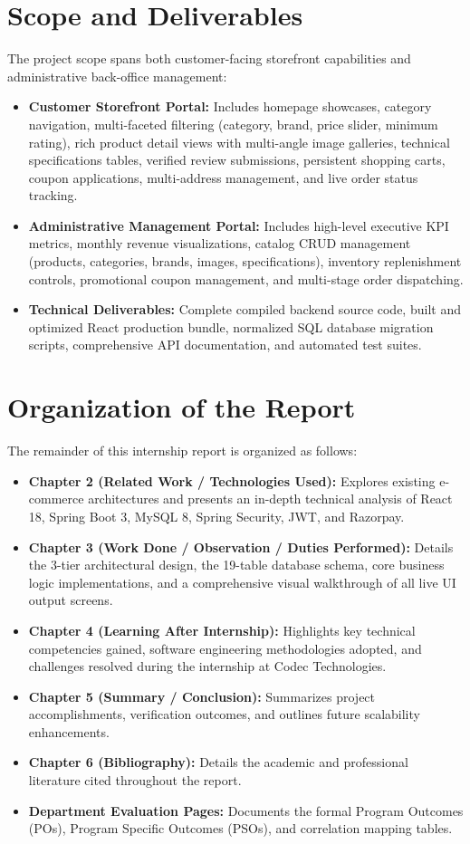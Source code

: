 \section{Scope and Deliverables}
The project scope spans both customer-facing storefront capabilities and administrative back-office management:
\begin{itemize}[leftmargin=2.0em]
    \item \textbf{Customer Storefront Portal:} Includes homepage showcases, category navigation, multi-faceted filtering (category, brand, price slider, minimum rating), rich product detail views with multi-angle image galleries, technical specifications tables, verified review submissions, persistent shopping carts, coupon applications, multi-address management, and live order status tracking.
    \item \textbf{Administrative Management Portal:} Includes high-level executive KPI metrics, monthly revenue visualizations, catalog CRUD management (products, categories, brands, images, specifications), inventory replenishment controls, promotional coupon management, and multi-stage order dispatching.
    \item \textbf{Technical Deliverables:} Complete compiled backend source code, built and optimized React production bundle, normalized SQL database migration scripts, comprehensive API documentation, and automated test suites.
\end{itemize}

\section{Organization of the Report}
The remainder of this internship report is organized as follows:
\begin{itemize}[leftmargin=2.0em]
    \item \textbf{Chapter 2 (Related Work / Technologies Used):} Explores existing e-commerce architectures and presents an in-depth technical analysis of React 18, Spring Boot 3, MySQL 8, Spring Security, JWT, and Razorpay.
    \item \textbf{Chapter 3 (Work Done / Observation / Duties Performed):} Details the 3-tier architectural design, the 19-table database schema, core business logic implementations, and a comprehensive visual walkthrough of all live UI output screens.
    \item \textbf{Chapter 4 (Learning After Internship):} Highlights key technical competencies gained, software engineering methodologies adopted, and challenges resolved during the internship at Codec Technologies.
    \item \textbf{Chapter 5 (Summary / Conclusion):} Summarizes project accomplishments, verification outcomes, and outlines future scalability enhancements.
    \item \textbf{Chapter 6 (Bibliography):} Details the academic and professional literature cited throughout the report.
    \item \textbf{Department Evaluation Pages:} Documents the formal Program Outcomes (POs), Program Specific Outcomes (PSOs), and correlation mapping tables.
\end{itemize}
